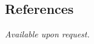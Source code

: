 \documentclass[margin,line,letterpaper]{resume}
\begin{document}
\begin{resume}
    \section{\mysidestyle References} 
    {\sl Available upon request.}






\end{resume}
\end{document}
